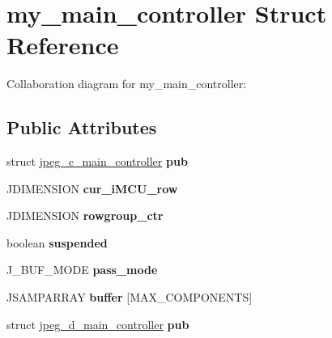 \hypertarget{structmy__main__controller}{\section{my\+\_\+main\+\_\+controller Struct Reference}
\label{structmy__main__controller}
}


Collaboration diagram for my\+\_\+main\+\_\+controller\+:
\subsection*{Public Attributes}
\begin{DoxyCompactItemize}
\item 
\hypertarget{structmy__main__controller_af6cfb28f856f55e4a715c8036f08c52f}{struct \hyperlink{structjpeg__c__main__controller}{jpeg\+\_\+c\+\_\+main\+\_\+controller} {\bfseries pub}}\label{structmy__main__controller_af6cfb28f856f55e4a715c8036f08c52f}

\item 
\hypertarget{structmy__main__controller_a1c6081c98910d41e03fa33763a832a6f}{J\+D\+I\+M\+E\+N\+S\+I\+O\+N {\bfseries cur\+\_\+i\+M\+C\+U\+\_\+row}}\label{structmy__main__controller_a1c6081c98910d41e03fa33763a832a6f}

\item 
\hypertarget{structmy__main__controller_a41bedbcd86bdc7611550440e02b8f93b}{J\+D\+I\+M\+E\+N\+S\+I\+O\+N {\bfseries rowgroup\+\_\+ctr}}\label{structmy__main__controller_a41bedbcd86bdc7611550440e02b8f93b}

\item 
\hypertarget{structmy__main__controller_aaae0f416fa5716cf5e0d295a191b2186}{boolean {\bfseries suspended}}\label{structmy__main__controller_aaae0f416fa5716cf5e0d295a191b2186}

\item 
\hypertarget{structmy__main__controller_a2de588274979de6f92951740a6e9d0ac}{J\+\_\+\+B\+U\+F\+\_\+\+M\+O\+D\+E {\bfseries pass\+\_\+mode}}\label{structmy__main__controller_a2de588274979de6f92951740a6e9d0ac}

\item 
\hypertarget{structmy__main__controller_a448676ac307b69b99e5457744515f058}{J\+S\+A\+M\+P\+A\+R\+R\+A\+Y {\bfseries buffer} \mbox{[}M\+A\+X\+\_\+\+C\+O\+M\+P\+O\+N\+E\+N\+T\+S\mbox{]}}\label{structmy__main__controller_a448676ac307b69b99e5457744515f058}

\item 
\hypertarget{structmy__main__controller_a4880459c57978ea5fcfef2a1acbfc3fe}{struct \hyperlink{structjpeg__d__main__controller}{jpeg\+\_\+d\+\_\+main\+\_\+controller} {\bfseries pub}}\label{structmy__main__controller_a4880459c57978ea5fcfef2a1acbfc3fe}


\end{DoxyCompactItemize}
